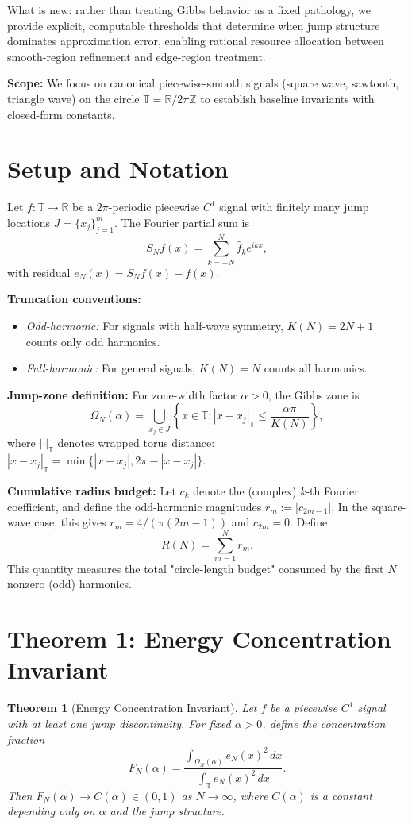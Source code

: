 \documentclass[11pt,letterpaper]{article}
\newtheorem{theorem}{Theorem}
\theoremstyle{remark}
\newcommand{\Real}{\mathbb{R}}
\newcommand{\Torus}{\mathbb{T}}
\begin{document}
What is new: rather than treating Gibbs behavior as a fixed pathology, we provide explicit, computable thresholds that determine when jump structure dominates approximation error, enabling rational resource allocation between smooth-region refinement and edge-region treatment.

\textbf{Scope:} We focus on canonical piecewise-smooth signals (square wave, sawtooth, triangle wave) on the circle $\Torus = \Real / 2\pi\mathbb{Z}$ to establish baseline invariants with closed-form constants.

\section{Setup and Notation}

Let $f: \Torus \to \Real$ be a $2\pi$-periodic piecewise $C^1$ signal with finitely many jump locations $J = \{x_j\}_{j=1}^{m}$. The Fourier partial sum is
\[
S_N f(x) = \sum_{k=-N}^{N} \hat{f}_k e^{ikx},
\]
with residual $e_N(x) = S_N f(x) - f(x)$.

\textbf{Truncation conventions:}
\begin{itemize}[nosep]
\item \emph{Odd-harmonic:} For signals with half-wave symmetry, $K(N) = 2N + 1$ counts only odd harmonics.
\item \emph{Full-harmonic:} For general signals, $K(N) = N$ counts all harmonics.
\end{itemize}

\textbf{Jump-zone definition:} For zone-width factor $\alpha > 0$, the Gibbs zone is
\[
\Omega_N(\alpha) = \bigcup_{x_j \in J} \left\{ x \in \Torus : |x - x_j|_{\Torus} \le \frac{\alpha \pi}{K(N)} \right\},
\]
where $|\cdot|_{\Torus}$ denotes wrapped torus distance: $|x - x_j|_{\Torus} = \min\{ |x - x_j|, 2\pi - |x - x_j| \}$.

\textbf{Cumulative radius budget:} Let $c_k$ denote the (complex) $k$-th Fourier coefficient, and define the odd-harmonic magnitudes $r_m := |c_{2m-1}|$. In the square-wave case, this gives $r_m = 4/(\pi(2m-1))$ and $c_{2m} = 0$. Define
\[
R(N) = \sum_{m=1}^{N} r_m.
\]
This quantity measures the total "circle-length budget" consumed by the first $N$ nonzero (odd) harmonics.

\section{Theorem 1: Energy Concentration Invariant}

\begin{theorem}[Energy Concentration Invariant]
\label{thm:energy}
Let $f$ be a piecewise $C^1$ signal with at least one jump discontinuity. For fixed $\alpha > 0$, define the concentration fraction
\[
F_N(\alpha) = \frac{\int_{\Omega_N(\alpha)} e_N(x)^2 \, dx}{\int_{\Torus} e_N(x)^2 \, dx}.
\]
Then $F_N(\alpha) \to C(\alpha) \in (0,1)$ as $N \to \infty$, where $C(\alpha)$ is a constant depending only on $\alpha$ and the jump structure.
\end{theorem}
\end{document}
